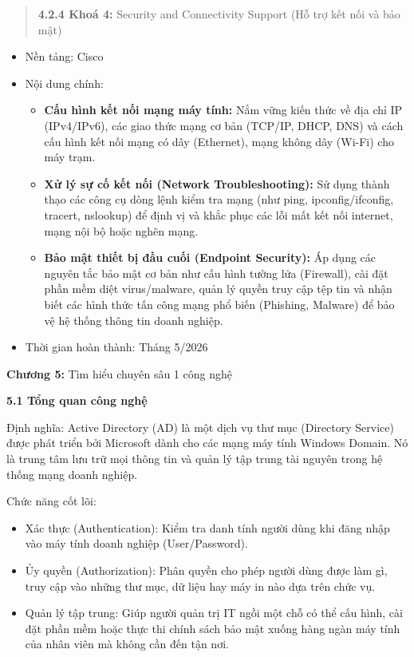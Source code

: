 \documentclass[
]{article}
\begin{document}
\begin{quote}
\textbf{4.2.4 Khoá 4:} Security and Connectivity Support (Hỗ trợ kết nối
và bảo mật)
\end{quote}

\begin{itemize}
\item
  Nền tảng: Cisco
\item
  Nội dung chính:

  \begin{itemize}
  \item
    \textbf{Cấu hình kết nối mạng máy tính:} Nắm vững kiến thức về địa
    chỉ IP (IPv4/IPv6), các giao thức mạng cơ bản (TCP/IP, DHCP, DNS) và
    cách cấu hình kết nối mạng có dây (Ethernet), mạng không dây (Wi-Fi)
    cho máy trạm.
  \item
    \textbf{Xử lý sự cố kết nối (Network Troubleshooting):} Sử dụng
    thành thạo các công cụ dòng lệnh kiểm tra mạng (như ping,
    ipconfig/ifconfig, tracert, nslookup) để định vị và khắc phục các
    lỗi mất kết nối internet, mạng nội bộ hoặc nghẽn mạng.
  \item
    \textbf{Bảo mật thiết bị đầu cuối (Endpoint Security):} Áp dụng các
    nguyên tắc bảo mật cơ bản như cấu hình tường lửa (Firewall), cài đặt
    phần mềm diệt virus/malware, quản lý quyền truy cập tệp tin và nhận
    biết các hình thức tấn công mạng phổ biến (Phishing, Malware) để bảo
    vệ hệ thống thông tin doanh nghiệp.
  \end{itemize}
\item
  Thời gian hoàn thành: Tháng 5/2026
\end{itemize}

\textbf{Chương 5:} Tìm hiểu chuyên sâu 1 công nghệ

\textbf{5.1 Tổng quan công nghệ}

Định nghĩa: Active Directory (AD) là một dịch vụ thư mục (Directory
Service) được phát triển bởi Microsoft dành cho các mạng máy tính
Windows Domain. Nó là trung tâm lưu trữ mọi thông tin và quản lý tập
trung tài nguyên trong hệ thống mạng doanh nghiệp.

Chức năng cốt lõi:

\begin{itemize}
\item
  Xác thực (Authentication): Kiểm tra danh tính người dùng khi đăng nhập
  vào máy tính doanh nghiệp (User/Password).
\item
  Ủy quyền (Authorization): Phân quyền cho phép người dùng được làm gì,
  truy cập vào những thư mục, dữ liệu hay máy in nào dựa trên chức vụ.
\item
  Quản lý tập trung: Giúp người quản trị IT ngồi một chỗ có thể cấu
  hình, cài đặt phần mềm hoặc thực thi chính sách bảo mật xuống hàng
  ngàn máy tính của nhân viên mà không cần đến tận nơi.
\end{itemize}
\end{document}
